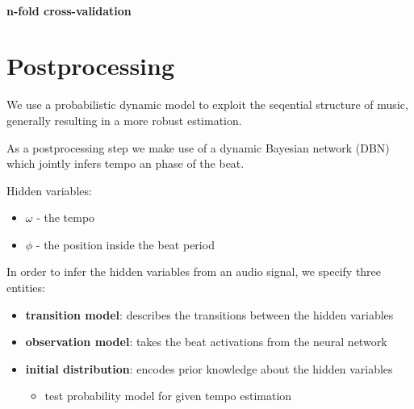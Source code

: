 \documentclass{article}
\begin{document}
\paragraph{n-fold cross-validation} 



\section{Postprocessing}

We use a probabilistic dynamic model to exploit the seqential structure of music, generally resulting in a more robust estimation.

As a postprocessing step we make use of a dynamic Bayesian network (DBN) which jointly infers tempo an phase of the beat.

\vspace{1em}
Hidden variables: 
\begin{itemize}
\item $\omega$ - the tempo
\item $\phi$ - the position inside the beat period
\end{itemize}

\vspace{1em}
In order to infer the hidden variables from an audio signal, we specify three entities:

\begin{itemize}
\item \textbf{transition model}: describes the transitions between the hidden variables 
\item \textbf{observation model}: takes the beat activations from the neural network
\item \textbf{initial distribution}: encodes prior knowledge about the hidden variables
\begin{itemize}
\item test probability model for given tempo estimation 
\end{itemize}
\end{itemize}
\end{document}
